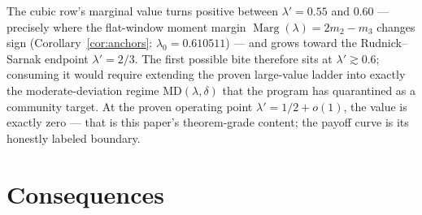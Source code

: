\documentclass[11pt]{article}
\theoremstyle{plain}
\theoremstyle{definition}
\theoremstyle{remark}
\newcommand{\Marg}{\operatorname{Marg}}
\begin{document}
The cubic row's marginal value turns positive between $\lambda' = 0.55$ and
$0.60$ --- precisely where the flat-window moment margin
$\Marg(\lambda) = 2 m_2 - m_3$ changes sign (Corollary~\ref{cor:anchors}:
$\lambda_0 = 0.610511$) --- and grows toward the Rudnick--Sarnak endpoint
$\lambda' = 2/3$. The first possible bite therefore sits at
$\lambda' \gtrsim 0.6$; consuming it would require extending the proven
large-value ladder into exactly the moderate-deviation regime
$\mathrm{MD}(\lambda, \delta)$ that the program has quarantined as a community
target. At the proven operating point $\lambda' = 1/2 + o(1)$, the value is
exactly zero --- that is this paper's theorem-grade content; the payoff curve is
its honestly labeled boundary.

\section{Consequences}
\label{sec:consequences}
\end{document}
